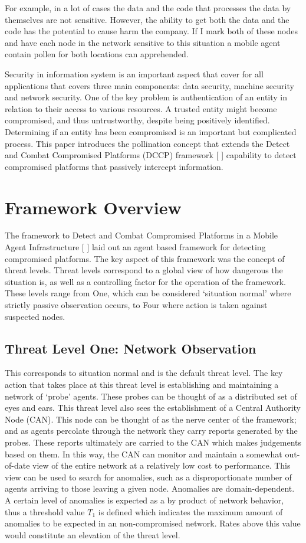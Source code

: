 \documentclass{acm_proc_article-sp}
\begin{document}
For example, in a lot of cases the data and the code that processes the data by themselves are not sensitive. However, the ability to get both the data and the code has the potential to cause harm the company. If I mark both of these nodes and have each node in the network sensitive to this situation a mobile agent contain pollen for both locations can apprehended.



Security in information system is an important aspect that cover for all applications that covers three main components: data security, machine security and network security. One of the key problem is authentication of an entity in relation to their access to various resources. A trusted entity might become compromised, and thus untrustworthy, despite being positively identified.  Determining if an entity has been compromised is an important but complicated process. This paper introduces the pollination concept that extends the Detect and Combat Compromised Platforms (DCCP) framework [ ] capability to detect compromised platforms that passively intercept information.

\section{Framework Overview}
The framework to Detect and Combat Compromised Platforms in a Mobile Agent Infrastructure [ ] laid out an agent based framework for detecting compromised platforms.  The key aspect of this framework was the concept of threat levels.  Threat levels correspond to a global view of how dangerous the situation is, as well as a controlling factor for the operation of the framework.  These levels range from One, which can be considered ‘situation normal’ where strictly passive observation occurs, to Four where action is taken against suspected nodes.  

\subsection{Threat Level One: Network Observation}
This corresponds to situation normal and is the default threat level.  The key action that takes place at this threat level is establishing and maintaining a network of ‘probe’ agents.  These probes can be thought of as a distributed set of eyes and ears.  This threat level also sees the establishment of a Central Authority Node (CAN).  This node can be thought of as the nerve center of the framework; and as agents percolate through the network they carry reports generated by the probes.  These reports ultimately are carried to the CAN which makes judgements based on them.  In this way, the CAN can monitor and maintain a somewhat out-of-date view of the entire network at a relatively low cost to performance.  This view can be used to search for anomalies, such as a disproportionate number of agents arriving to those leaving a given node.  Anomalies are domain-dependent.  A certain level of anomalies is expected as a by product of network behavior, thus a threshold value $T_1$ is defined which indicates the maximum amount of anomalies to be expected in an non-compromised network.  Rates above this value would constitute an elevation of the threat level.
\end{document}
